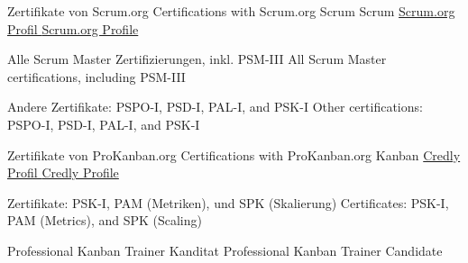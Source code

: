 {
}


\begin{cventries}

	\cventry
	{
			{ Zertifikate von Scrum.org }
			{ Certifications with Scrum.org }
	} %
	{
			{ Scrum }
			{ Scrum }
	} %
	{
		\href{https://www.scrum.org/user/601291}{
				{ Scrum.org Profil }
				{ Scrum.org Profile }
		}
	} %
	{
	} %
	{
		\begin{cvitems} %
			\item {
					{ Alle Scrum Master Zertifizierungen, inkl. PSM-III }
					{ All Scrum Master certifications, including PSM-III }
			}
			\item {
					{ Andere Zertifikate: PSPO-I, PSD-I, PAL-I, and PSK-I }
					{ Other certifications: PSPO-I, PSD-I, PAL-I, and PSK-I }
			}		
		\end{cvitems}
	}
	
	\cventry
	{ 	}
	{  	}
	{  	}
	{  	}
	{  	}
	
  	\cventry
  	{  		
  			{ Zertifikate von ProKanban.org }
  			{ Certifications with ProKanban.org }
  	} %
  	{
  		Kanban
  	} %
  	{
  		\href{https://www.credly.com/users/benjamin-huser}{
				{ Credly Profil }
				{ Credly Profile }
		}
  	} %
  	{
  	} %
  	{
  		\begin{cvitems} %
  			\item {
  					{ Zertifikate: PSK-I, PAM (Metriken), und SPK (Skalierung) }
  					{ Certificates: PSK-I, PAM (Metrics), and SPK (Scaling) }
  			}
  			\item {
  					{ Professional Kanban Trainer Kanditat }
  					{ Professional Kanban Trainer Candidate }
  			}
  		\end{cvitems}
  	}
  	
  	\cventry
  	{ 	}
  	{  	}
  	{  	}
  	{  	}
  	{  	}
\end{cventries}
